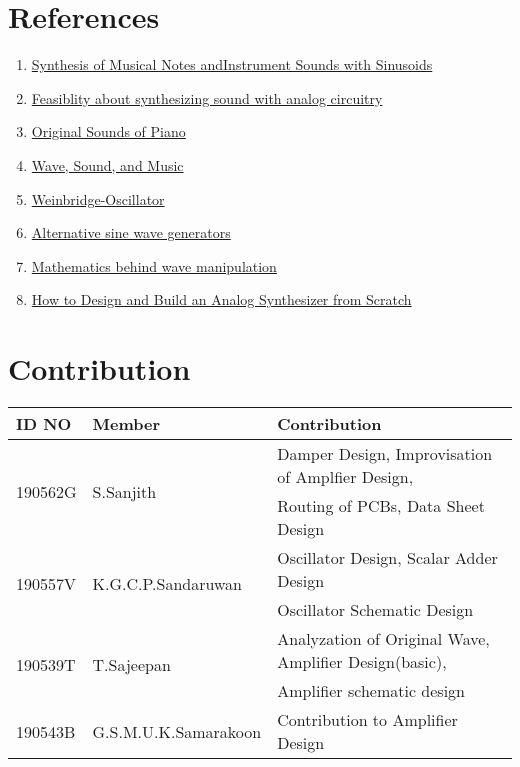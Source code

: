 \section*{References}
\begin{enumerate}
    \item \href{https://web.eecs.utk.edu/~hqi/ece505/project/proj1.pdf}{Synthesis of Musical Notes andInstrument Sounds with Sinusoids}
    \item \href{https://electronics.stackexchange.com/questions/178975/is-it-feasible-to-synthesise-sound-with-analog-circuitry-these-days}{Feasiblity about synthesizing sound with analog
              circuitry}
    \item \href{http://www.vibrationdata.com/piano.htm}{Original Sounds of Piano}
    \item \href{https://universe-review.ca/R12-03-wave02.htm}{Wave, Sound, and Music}
    \item  \href{https://en.wikipedia.org/wiki/Wien_bridge_oscillator}{Weinbridge-Oscillator}
    \item \href{https://www.homemade-circuits.com/simple-sine-wave-generator-circuits/}{Alternative sine wave generators}
    \item \href{https://www.ams.jhu.edu/dan-mathofmusic/sound-waves/}{Mathematics behind wave manipulation}
    \item \href{http://www.jiisuki.net/reports/howto-build-analog-synth.pdf}{How to Design and Build an Analog Synthesizer from Scratch}
\end{enumerate}
\vspace*{5cm}
\section*{Contribution}
\begin{tabular}{|l|l|l|}
    \toprule
    ID NO                    & Member                              & Contribution                                           \\
    \midrule\midrule
    \multirow{2}{*}{190562G} & \multirow{2}{*}{S.Sanjith}          & Damper Design, Improvisation of Amplfier Design,       \\
                             &                                     & Routing of PCBs, Data Sheet Design                     \\
    \midrule
    \multirow{2}{*}{190557V} & \multirow{2}{*}{K.G.C.P.Sandaruwan} & Oscillator Design, Scalar Adder Design                 \\
                             &                                     & Oscillator Schematic Design                            \\
    \midrule
    \multirow{2}{*}{190539T} & \multirow{2}{*}{T.Sajeepan}         & Analyzation of Original Wave, Amplifier Design(basic), \\
                             &                                     & Amplifier schematic design                             \\
    \midrule
    190543B                  & G.S.M.U.K.Samarakoon                & Contribution to Amplifier Design                       \\
    \bottomrule
\end{tabular}